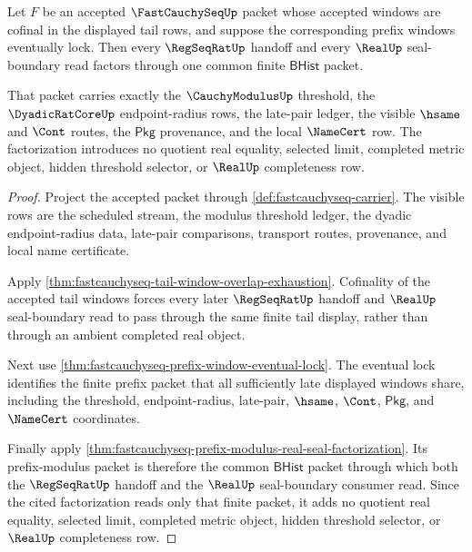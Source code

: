\begin{theorem}
\label{thm:fastcauchyseq-tail-lock-real-boundary}
Let $F$ be an accepted $\FastCauchySeqUp$ packet whose accepted windows are
cofinal in the displayed tail rows, and suppose the corresponding prefix
windows eventually lock. Then every $\RegSeqRatUp$ handoff and every $\RealUp$
seal-boundary read factors through one common finite $\mathsf{BHist}$ packet.

That packet carries exactly the $\CauchyModulusUp$ threshold, the
$\DyadicRatCoreUp$ endpoint-radius rows, the late-pair ledger, the visible
$\hsame$ and $\Cont$ routes, the $\mathsf{Pkg}$ provenance, and the local
$\NameCert$ row. The factorization introduces no quotient real equality,
selected limit, completed metric object, hidden threshold selector, or
$\RealUp$ completeness row.
\end{theorem}
\begin{proof}
Project the accepted packet through
\autoref{def:fastcauchyseq-carrier}. The visible rows are the scheduled stream,
the modulus threshold ledger, the dyadic endpoint-radius data, late-pair
comparisons, transport routes, provenance, and local name certificate.

Apply \autoref{thm:fastcauchyseq-tail-window-overlap-exhaustion}. Cofinality of
the accepted tail windows forces every later $\RegSeqRatUp$ handoff and
$\RealUp$ seal-boundary read to pass through the same finite tail display,
rather than through an ambient completed real object.

Next use \autoref{thm:fastcauchyseq-prefix-window-eventual-lock}. The eventual
lock identifies the finite prefix packet that all sufficiently late displayed
windows share, including the threshold, endpoint-radius, late-pair, $\hsame$,
$\Cont$, $\mathsf{Pkg}$, and $\NameCert$ coordinates.

Finally apply
\autoref{thm:fastcauchyseq-prefix-modulus-real-seal-factorization}. Its
prefix-modulus packet is therefore the common $\mathsf{BHist}$ packet through
which both the $\RegSeqRatUp$ handoff and the $\RealUp$ seal-boundary consumer
read. Since the cited factorization reads only that finite packet, it adds no
quotient real equality, selected limit, completed metric object, hidden
threshold selector, or $\RealUp$ completeness row.
\end{proof}

